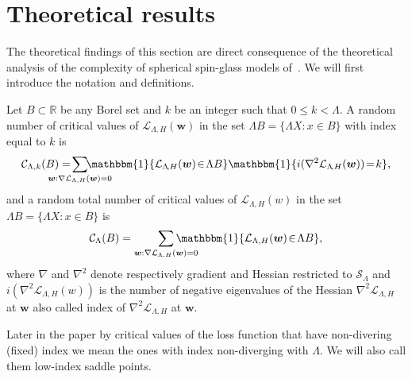 \documentclass[twoside]{article}
\begin{document}
\section{Theoretical results}
\label{sec:theory}
The theoretical findings of this section are direct consequence of the theoretical analysis of the complexity of spherical spin-glass models of~\cite{AAC2010}. We will first introduce the notation and definitions. 
\begin{definition}
Let $B \subset \mathbb{R}$ be any Borel set and $k$ be an integer such that $0 \leq k < \Lambda$. A random number of critical values of $\mathcal{L}_{\Lambda,H}({\bm w})$ in the set $\Lambda B = \{\Lambda X:x\in B\}$ with index equal to $k$ is
\[\mathcal{C}_{\Lambda,k}(B) = \!\!\!\!\!\!\!\!\!\!\!\!\!\!\sum_{{\bm w}:\nabla \mathcal{L}_{\Lambda,H}({\bm w}) = 0}\!\!\!\!\!\!\!\!\!\!\!\!\!\!\!\mathbbm{1}\{\mathcal{L}_{\Lambda\!,H}({\bm w})\!\in\! \Lambda B\}\mathbbm{1}\{i(\nabla^2\mathcal{L}_{\Lambda\!,H}({\bm w})) \!=\! k\},
\]
and a random total number of critical values of $\mathcal{L}_{\Lambda,H}(w)$ in the set $\Lambda B = \{\Lambda X:x\in B\}$ is
\[\mathcal{C}_{\Lambda}(B) = \sum_{{\bm w}:\nabla \mathcal{L}_{\Lambda,H}({\bm w}) = 0}\!\!\!\!\!\!\!\!\!\!\!\!\!\mathbbm{1}\{\mathcal{L}_{\Lambda,H}({\bm w})\!\in\! \Lambda B\},
\]
where $\nabla$ and $\nabla^2$ denote respectively gradient and Hessian restricted to $\mathcal{S}_{\Lambda}$ and $i(\nabla^2\mathcal{L}_{\Lambda,H}(w))$ is the number of negative eigenvalues of the Hessian $\nabla^2\mathcal{L}_{\Lambda,H}$ at ${\bm w}$ also called index of $\nabla^2\mathcal{L}_{\Lambda,H}$ at ${\bm w}$.
\end{definition}
Later in the paper by critical values of the loss function that have non-divering (fixed) index we mean the ones with index non-diverging with $\Lambda$. We will also call them low-index saddle points.
\end{document}
